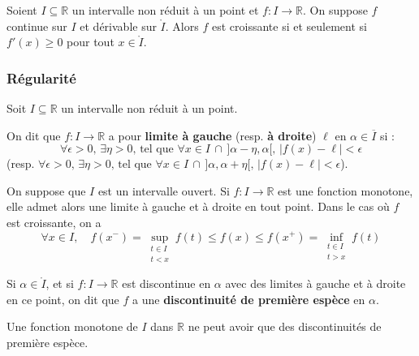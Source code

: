 
  \begin{proposition}
    Soient $I \subseteq \mathbb{R}$ un intervalle non réduit à un point et $f : I \rightarrow \mathbb{R}$. On suppose $f$ continue sur $I$ et dérivable sur $\mathring{I}$. Alors $f$ est croissante si et seulement si $f'(x) \geq 0$ pour tout $x \in \mathring{I}$.
  \end{proposition}

  \subsubsection{Régularité}


  Soit $I \subseteq \mathbb{R}$ un intervalle non réduit à un point.

  \begin{definition}
    On dit que $f : I \rightarrow \mathbb{R}$ a pour \textbf{limite à gauche} (resp. \textbf{à droite}) $\ell$ en $\alpha \in \overline{I}$ si :
    \[ \forall \epsilon > 0, \, \exists \eta > 0, \, \text{tel que } \forall x \in I \, \cap \, ]\alpha-\eta, \alpha[, \, |f(x) - \ell| < \epsilon \]
    (resp. $\forall \epsilon > 0, \, \exists \eta > 0, \, \text{tel que } \forall x \in I \, \cap \, ]\alpha, \alpha+\eta[, \, |f(x) - \ell| < \epsilon$).
  \end{definition}

  \begin{theorem}
    On suppose que $I$ est un intervalle ouvert. Si $f : I \rightarrow \mathbb{R}$ est une fonction monotone, elle admet alors une limite à gauche et à droite en tout point. Dans le cas où $f$ est croissante, on a
    \[ \forall x \in I, \quad f(x^-) = \sup_{\substack{t \in I \\ t < x}} f(t) \leq f(x) \leq f(x^+) = \inf_{\substack{t \in I \\ t > x}} f(t) \]
  \end{theorem}

  \begin{definition}
    Si $\alpha \in \mathring{I}$, et si $f : I \rightarrow \mathbb{R}$ est discontinue en $\alpha$ avec des limites à gauche et à droite en ce point, on dit que $f$ a une \textbf{discontinuité de première espèce} en $\alpha$.
  \end{definition}

  \begin{proposition}
    Une fonction monotone de $I$ dans $\mathbb{R}$ ne peut avoir que des discontinuités de première espèce.
  \end{proposition}

